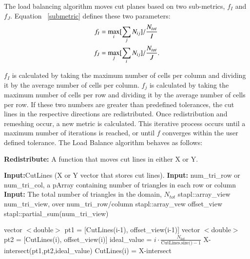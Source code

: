 \documentclass{anstrans}
\begin{document}
The load balancing algorithm moves cut planes based on two sub-metrics, $f_I$ and $f_J$. Equation ~\eqref{submetric} defines these two parameters:
\begin{align}
f_I &= \underset{i}{\text{max}}[\sum_{j} N_{ij}]/\frac{N_{tot}}{I} \notag \\
f_J &= \underset{j}{\text{max}}[\sum_{i} N_{ij}]/\frac{N_{tot}}{J}.
\label{submetric}
\end{align}

$f_I$ is calculated by taking the maximum number of cells per column and dividing it by the average number of cells per column. $f_j$ is calculated by taking the maximum number of cells per row and dividing it by the average number of cells per row. If these two numbers are greater than predefined tolerances, the cut lines in the respective directions are redistributed. Once redistribution and remeshing occur, a new metric is calculated. This iterative process occurs until a maximum number of iterations is reached, or until $f$ converges within the user defined tolerance. The Load Balance algorithm behaves as follows:



\begin{algorithm}
\textbf{Redistribute:} A function that moves cut lines in either X or Y. \\
\begin{algorithmic}
\STATE \textbf{Input:}CutLines (X or Y vector that stores cut lines). 
\STATE \textbf{Input:} num\_tri\_row or num\_tri\_col, a pArray containing number of triangles in each row or column 
\STATE \textbf{Input:} The total number of triangles in the domain, $N_{tot}$
\STATE stapl::array\_view num\_tri\_view, over num\_tri\_row/column
\STATE stapl::array\_vew offset\_view
\STATE stapl::partial\_sum(num\_tri\_view) 

	\STATE vector $<$double$>$ pt1 = [CutLines(i-1), offset\_view(i-1)]
	\STATE vector $<$double$>$ pt2 = [CutLines(i), offset\_view(i)]
	\STATE ideal\_value = $i\cdot \frac{N_{tot}}{\text{CutLines.size()}-1}$
	\STATE X-intersect(pt1,pt2,ideal\_value) 
	\STATE CutLines(i) = X-intersect
\ENDFOR
\end{algorithmic}
\end{algorithm}
\end{document}
